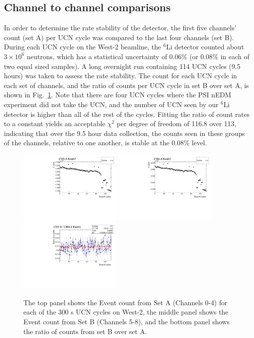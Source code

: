 \documentclass[letter,twocolumn,preprint,3p]{elsarticle}
\begin{document}
\subsection{ Channel to channel comparisons }

In order to determine the rate stability of the detector, the first
five channels' count (set A) per UCN cycle was compared to the last
four channels (set B).  During each UCN cycle on the West-2 beamline,
the $^6$Li detector counted about $3\times10^6$ neutrons, which has a
statistical uncertainty of 0.06\% (or 0.08\% in each of two equal
sized samples).  A long overnight run containing 114 UCN cycles (9.5
hours) was taken to assess the rate stability.  The count for each UCN
cycle in each set of channels, and the ratio of counts per UCN cycle
in set B over set A, is shown in Fig.~\ref{fig:ratiocount}.  Note that
there are four UCN cycles where the PSI nEDM experiment did not take
the UCN, and the number of UCN seen by our $^6$Li detector is higher
than all of the rest of the cycles.  Fitting the ratio of count rates
to a constant yields an acceptable $\chi^2$ per degree of freedom of
116.8 over 113, indicating that over the 9.5 hour data collection, the
counts seen in these groups of the channels, relative to one another,
is stable at the 0.08\% level.

\begin{figure}[!htpb]
\centering
\includegraphics[width=0.45\textwidth]{figures/ratestab_ch04_Run62.pdf}
\includegraphics[width=0.45\textwidth]{figures/ratestab_ch58_Run62.pdf}
\includegraphics[width=0.45\textwidth]{figures/ratestab_ratio_Run62.pdf}
\caption{ The top panel shows the Event count from Set A (Channels
  0-4) for each of the 300 s UCN cycles on West-2, the middle panel
  shows the Event count from Set B (Channels 5-8), and the bottom
  panel shows the ratio of counts from set B over set A.}
\label{fig:ratiocount}
\end{figure}
\end{document}
